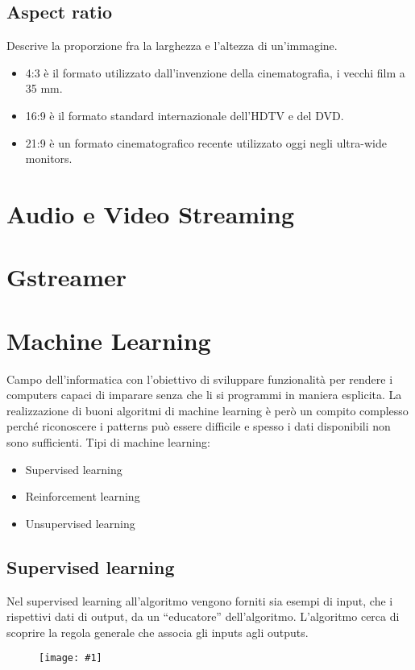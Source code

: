 \documentclass[8pt,a4paper]{article}
\newcommand{\f}[1]{
      \begin{figure}[H]
        \center
      \texttt{[image: \#1]}
      \end{figure}
}
\begin{document}
\begin{multicols}{5}
    \subsection{Aspect ratio}
    Descrive la proporzione fra la larghezza e l’altezza di un’immagine.
    \begin{itemize}
      \item 4:3 è il formato utilizzato dall’invenzione della cinematografia, i vecchi 
      film a 35 mm.
      \item 16:9 è il formato standard internazionale dell’HDTV e del DVD.
      \item 21:9 è un formato cinematografico recente utilizzato oggi negli 
      ultra-wide monitors.
    \end{itemize}
    \section{Audio e Video Streaming}

    \section{Gstreamer}



    \section{Machine Learning}
    Campo dell'informatica con l'obiettivo di sviluppare funzionalità per rendere
    i computers capaci di imparare senza che li si programmi in maniera esplicita.
    La realizzazione di buoni algoritmi di machine learning è però un compito complesso
    perché riconoscere i patterns può essere difficile e spesso i dati disponibili
    non sono sufficienti.
    Tipi di machine learning:
    \begin{itemize}
    \item Supervised learning
    \item Reinforcement learning
    \item Unsupervised learning
    \end{itemize}
    
    \subsection{Supervised learning}
    Nel supervised learning all’algoritmo vengono forniti sia esempi di input, che i
    rispettivi dati di output, da un “educatore” dell’algoritmo. L’algoritmo cerca di
    scoprire la regola generale che associa gli inputs agli outputs.
    \f{SupervisedLearning}
    

\end{multicols}
\end{document}
